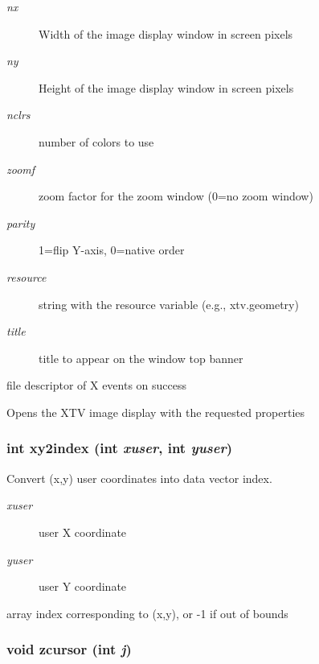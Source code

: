 \begin{Desc}
\item[Parameters:]
\begin{description}
\item[{\em nx}]Width of the image display window in screen pixels \item[{\em ny}]Height of the image display window in screen pixels \item[{\em nclrs}]number of colors to use \item[{\em zoomf}]zoom factor for the zoom window (0=no zoom window) \item[{\em parity}]1=flip Y-axis, 0=native order \item[{\em resource}]string with the resource variable (e.g., xtv.geometry) \item[{\em title}]title to appear on the window top banner\end{description}
\end{Desc}
\begin{Desc}
\item[Returns:]file descriptor of X events on success\end{Desc}
Opens the XTV image display with the requested properties 
\subsubsection{\setlength{\rightskip}{0pt plus 5cm}int xy2index (int {\em xuser}, int {\em yuser})}\label{xtv_8h_a118}


Convert (x,y) user coordinates into data vector index. 

\begin{Desc}
\item[Parameters:]
\begin{description}
\item[{\em xuser}]user X coordinate \item[{\em yuser}]user Y coordinate \end{description}
\end{Desc}
\begin{Desc}
\item[Returns:]array index corresponding to (x,y), or -1 if out of bounds \end{Desc}
\subsubsection{\setlength{\rightskip}{0pt plus 5cm}void zcursor (int {\em j})}\label{xtv_8h_a100}


